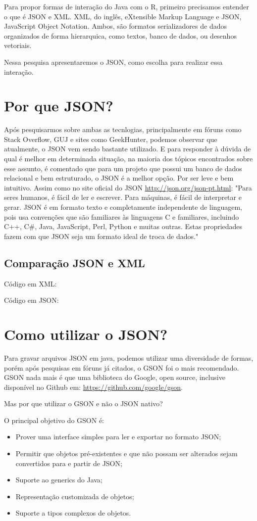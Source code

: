 \documentclass[12pt,a4paper]{article}
\begin{document}
Para propor formas de interação do Java com o R, primeiro precisamos entender o que é JSON e XML. XML, do inglês, eXtensible Markup Language e JSON, JavaScript Object Notation. Ambos, são formatos serializadores de dados organizados de forma hierarquica, como textos, banco de dados, ou desenhos vetoriais.

Nessa pesquisa apresentaremos o JSON, como escolha para realizar essa interação.

\section{Por que JSON?}
Após pesquisarmos sobre ambas as tecnlogias, principalmente em fóruns como Stack Overflow, GUJ e sites como GeekHunter, podemos observar que atualmente, o JSON vem sendo bastante utilizado. E para responder à dúvida de qual é melhor em determinada situação, na maioria dos tópicos encontrados sobre esse assunto, é comentado que para um projeto que possui um banco de dados relacional e bem estruturado, o JSON é a melhor opção. Por ser leve e bem intuitivo. Assim como no site oficial do JSON \url{http://json.org/json-pt.html}: "Para seres humanos, é fácil de ler e escrever. Para máquinas, é fácil de interpretar e gerar. JSON é em formato texto e completamente independente de linguagem, pois usa convenções que são familiares às linguagens C e familiares, incluindo C++, C\#, Java, JavaScript, Perl, Python e muitas outras. Estas propriedades fazem com que JSON seja um formato ideal de troca de dados."

\subsection{Comparação JSON e XML}
Código em XML: 


Código em JSON: 



\section{Como utilizar o JSON?}
Para gravar arquivos JSON em java, podemos utilizar uma diversidade de formas, porém após pesquisas em fóruns já citados, o GSON foi o mais recomendado. GSON nada mais é que uma biblioteca do Google, open source, inclusive disponível no Github em: \url{https://github.com/google/gson}.

Mas por que utilizar o GSON e não o JSON nativo?

O principal objetivo do GSON é: 
\begin{itemize}
\item Prover uma interface simples para ler e exportar no formato JSON;
\item Permitir que objetos pré-existentes e que não possam ser alterados sejam convertidos para e partir de JSON;
\item Suporte ao generics do Java;
\item Representação customizada de objetos;
\item Suporte a tipos complexos de objetos.
\end{itemize}
\end{document}
